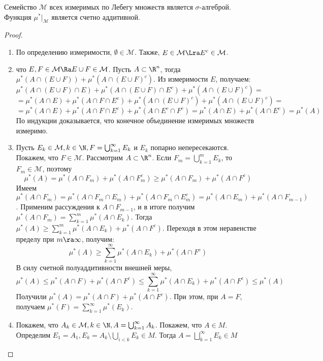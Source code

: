 \begin{theorem}[Каратиодори]
    Семейство \(\mathcal{M}\) всех измеримых по Лебегу множеств является \(\sigma\)-алгеброй. Функция \(\mu^*|_{\mathcal{M}}\) является счетно аддитивной.
\end{theorem}
\begin{proof}\indent
    \begin{enumerate}
        \item По определению измеримости, \(\emptyset \in \mathcal{M}\). Также, \(E \in \mathcal{M} \Lra E^c \in \mathcal{M}\).
        \item что \(E, F \in \mathcal{M} \Ra E \cup F \in \mathcal{M}\). Пусть \(A \subset \R^n\), тогда \(\mu^*(A \cap (E \cup F)) + \mu^*(A \cap (E \cup F)^c)\). Из измеримости \(E\), получаем: 
        \[\mu^*(A \cap (E \cup F) \cap E) + \mu^*(A \cap (E \cup F) \cap E^c) + \mu^*(A \cap (E \cup F)^c) =\]
        \[= \mu^*(A \cap E) + \mu^*(A \cap F \cap E^c) + \mu^*(A \cap (E\cup F)^c) + \mu^*(A \cap (E \cup F)^c) = \]
        \[= \mu^*(A \cap E) + \mu^*(A \cap F \cap E^c) + \mu^*(A \cap E^c\cap F^c)= \mu^*(A \cap E) + \mu^*(A \cap E^c) = \mu^*(A)\]
        По индукции доказывается, что конечное объединение измеримых множеств измеримо.
        \item Пусть \(E_k \in \mathcal{M}, k \in \N, F = \bigcup_{k = 1}^\infty E_k\) и \(E_k\) попарно непересекаются. Покажем, что \(F \in \mathcal{M}\). Рассмотрим \(A \subset \R^n\). Если \(F_m = \bigcup_{k = 1}^m E_k\), то \(F_m \in \mathcal{M}\), поэтому 
        \[\mu^*(A) = \mu^*(A \cap F_m) + \mu^*(A \cap F_m^c) \ge \mu^*(A \cap F_m) + \mu^*(A \cap F^c)\]
        Имеем \(\mu^*(A \cap F_m) = \mu^*(A \cap F_m \cap E_m) + \mu^*(A \cap F_m \cap E_m^c) = \mu^*(A \cap E_m) + \mu^*(A \cap F_{m - 1})\). Применим рассуждения к \(A \cap F_{m - 1}\), и в итоге получим \(\mu^*(A \cap F_m) = \sum_{k = 1}^m \mu^*(A \cap E_k)\). Тогда \(\mu^*(A) \ge \sum_{k = 1}^m \mu^*(A \cap E_k) + \mu^*(A \cap F^c)\). Переходя в этом неравенстве пределу при \(m \ra \infty\), получим:
        \[\mu^*(A) \ge \sum_{k = 1}^\infty \mu^*(A \cap E_k) + \mu^*(A \cap F^c)\]
        В силу счетной полуаддитивности внешней меры, 
        \[\mu^*(A) \le \mu^*(A \cap F) + \mu^*(A \cap F^c) \le \sum_{k = 1}^\infty\mu^*(A \cap E_k) + \mu^*(A \cap F^c) \le \mu^*(A)\]
        Получили \(\mu^*(A) = \mu^*(A \cap F) + \mu^*(A \cap F^c)\). При этом, при \(A = F\), получаем \(\mu^*(F) = \sum_{k = 1}^\infty \mu^*(E_k)\).
        \item Покажем, что \(A_k \in \mathcal{M}, k \in \N, A = \bigcup_{k = 1}^\infty A_k\). Покажем, что \(A \in M\). Определим \(E_1 = A_1, E_k = A_k \setminus \bigcup_{i < k} E_k \in M\). Тогда \(A = \bigsqcup_{k = 1}^\infty E_k \in M\)
    \end{enumerate}
\end{proof}

